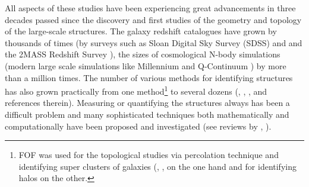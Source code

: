 \documentclass[fleqn,usenatbib,useAMS]{mnras}
\begin{document}
All aspects of these studies have been experiencing great advancements in  three decades passed since the discovery and first studies of the geometry and topology  of the large-scale structures. The galaxy redshift catalogues have grown by thousands of times (by surveys such as Sloan Digital Sky Survey (SDSS) \citealt{Tegmark2003} and \citealt{Albareti2016} and the 2MASS Redshift Survey \citealt{Huchra2012}), the sizes of cosmological N-body simulations (modern large scale simulations like Millennium \citealt{Springel2005b} and Q-Continuum \citealt{Heitmann2015}) by more than a million times. The number of various methods for identifying  structures has also grown practically from  one method\footnote{FOF was used for the topological studies via percolation technique and identifying super clusters of galaxies (\citealt{Zeldovich1982}, \citealt{Shandarin1983}, \citealt{Shandarin1983b} on the one hand and for identifying halos \citealt{Davis1985} on the other.}  to several dozens (\citealt{Colberg2008}, \citealt{Knebe2011a}, \citealt{Onions2012}, \citealt{Knebe2013} and references therein). Measuring or quantifying  the structures always has  been a difficult problem and many sophisticated  techniques both mathematically and computationally have been proposed and investigated (see reviews by \citealt{Weygaert2008c}, \citealt{Weygaert2008}).
\end{document}
